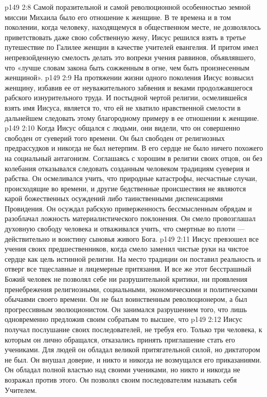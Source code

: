 \vs p149 2:8 \pc Самой поразительной и самой революционной особенностью земной миссии Михаила было его отношение к женщине. В те времена и в том поколении, когда человеку, находящемуся в общественном месте, не дозволялось приветствовать даже свою собственную жену, Иисус решился взять в третье путешествие по Галилее женщин в качестве учителей евангелия. И притом имел непревзойденную смелость делать это вопреки учения раввинов, объявлявшего, что «лучше словам закона быть сожженным в огне, чем быть произнесенным женщиной».
\vs p149 2:9 На протяжении жизни одного поколения Иисус возвысил женщину, избавив ее от неуважительного забвения и веками продолжавшегося рабского изнурительного труда. И постыдной чертой религии, осмелившейся взять имя Иисуса, является то, что ей не хватило нравственной смелости в дальнейшем следовать этому благородному примеру в ее отношении к женщине.
\vs p149 2:10 \pc Когда Иисус общался с людьми, они видели, что он совершенно свободен от суеверий того времени. Он был свободен от религиозных предрассудков и никогда не был нетерпим. В его сердце не было ничего похожего на социальный антагонизм. Соглашаясь с хорошим в религии своих отцов, он без колебания отказывался следовать созданным человеком традициям суеверия и рабства. Он осмеливался учить, что природные катастрофы, несчастные случаи, происходящие во времени, и другие бедственные происшествия не являются карой божественных осуждений либо таинственными диспенсациями Провидения. Он осуждал рабскую приверженность бессмысленным обрядам и разоблачал ложность материалистического поклонения. Он смело провозглашал духовную свободу человека и отваживался учить, что смертные во плоти --- действительно и воистину сыновья живого Бога.
\vs p149 2:11 Иисус превзошел все учения своих предшественников, когда смело заменил чистые руки на чистое сердце как цель истинной религии. На место традиции он поставил реальность и отверг все тщеславные и лицемерные притязания. И все же этот бесстрашный Божий человек не позволял себе ни разрушительной критики, ни проявления пренебрежения религиозными, социальными, экономическими и политическими обычаями своего времени. Он не был воинственным революционером, а был прогрессивным эволюционистом. Он занимался разрушением того, что  лишь одновременно предложив своим собратьям то высшее, что 
\vs p149 2:12 \pc Иисус получал послушание своих последователей, не требуя его. Только три человека, к которым он лично обращался, отказались принять приглашение стать его учениками. Для людей он обладал великой притягательной силой, но диктатором не был. Он внушал доверие, и никто и никогда не возмущался его приказаниями. Он обладал полной властью над своими учениками, но никто и никогда не возражал против этого. Он позволял своим последователям называть себя Учителем.
